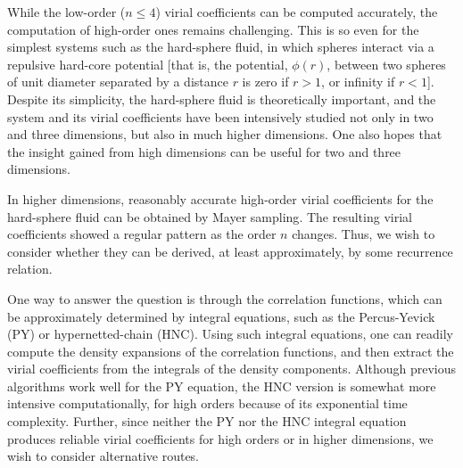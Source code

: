 \documentclass[aip,jcp,preprint,superscriptaddress,showpacs,preprintnumbers,amsmath,amssymb]{revtex4-1}
\begin{document}
While the low-order ($n\le4$) virial coefficients
can be computed accurately\cite{
vanderwaals1899, *vanlaar1899,
*rushbrooke1961, *hemmer1965, *kim1968, *kilpatrick1971,
*dyer2001, *sun1996,
nijboer1952,
kratky1982,
luban1982, *joslin1982, *clisby2004a, *lyberg2005},
the computation of high-order ones remains challenging\cite{
wheatley2013, masters2008}.
%
This is so even for the simplest systems
such as the hard-sphere fluid\cite{
wheatley2013, kratky1982,
metropolis1953, *rosenbluth1954, *ree1964a,
*ree1967, *vanrensburg1993, *bishop1999,
*vlasov2002, *kolafa2004, *bishop2004, *bishop2005,
*labik2005, *clisby2005, *bishop2008,
clisby2004b, *clisby2006,
zhang2014, schultz2014},
%
in which spheres interact via
a repulsive hard-core potential
[that is,
the potential, $\phi(r)$, between two spheres of unit diameter
separated by a distance $r$ is zero if $r > 1$,
or infinity if $r < 1$].
%
Despite its simplicity,
the hard-sphere fluid is theoretically important,
and the system and its virial coefficients
have been intensively studied
not only in two and three dimensions,
but also in much higher dimensions\cite{
luban1982, *joslin1982, *clisby2004a, *lyberg2005,
clisby2004b, *clisby2006,
adda-bedia2008a, *adda-bedia2008b,
*finken2001, *frisch1999, *frisch1985, *kurchan2012,
*loeser1991, *parisi2000, *robles2004, *robles2007,
*rohrmann2007, *rohrmann2008, *skoge2006,
*torquato2006a, *torquato2006b,
*wyler1987}.
%
One also hopes that
the insight gained from high dimensions
can be useful for two and three dimensions.



In higher dimensions,
reasonably accurate high-order virial coefficients
for the hard-sphere fluid can be obtained\cite{zhang2014}
by Mayer sampling\cite{schultz2014,
rast1999, *labik2003, *singh2004, *naresh2009a, *naresh2009b,
*benjamin2007, *schultz2009, *shaul2010, *tan2010,
*shaul2012, *schultz2013, *yang2013,
kwak2005, shaul2011}.
%
The resulting virial coefficients
showed a regular pattern as the order $n$ changes.
%
Thus, we wish to consider
whether they can be derived,
at least approximately,
by some recurrence relation.



One way to answer the question is
through the correlation functions,
which can be approximately determined
by integral equations,
such as the Percus-Yevick (PY)\cite{percusyevick}
or hypernetted-chain (HNC)\cite{
morita1958, *morita1959, morita1960,
vanleeuwen1959, *meeron1960, *verlet1960, *green1960, *rushbrooke1960}.
%
Using such integral equations,
one can readily compute
the density expansions of the correlation functions,
and then extract the virial coefficients
from the integrals of the density components\cite{
shaul2011}.
%
Although previous algorithms\cite{shaul2011}
work well for the PY equation,
the HNC version is somewhat more intensive computationally,
for high orders
because of its exponential time complexity.
%
Further,
since neither the PY nor the HNC integral equation
produces reliable virial coefficients for high orders
or in higher dimensions, we wish to consider alternative routes.
\end{document}

